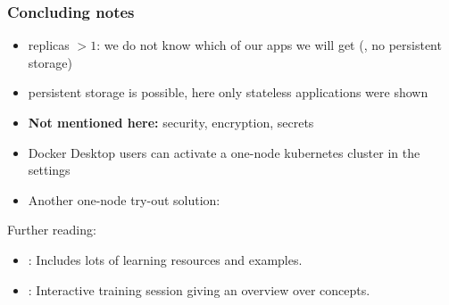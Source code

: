 \begin{frame}
	\frametitle{Concluding notes}
	
	\begin{itemize}
		\item replicas $>1$: we do not know which of our apps we will get (, no persistent storage)
		\item persistent storage is possible, here only stateless applications were shown
		\item \textbf{Not mentioned here:} security, encryption, secrets
		\item Docker Desktop users can activate a one-node kubernetes cluster in the settings
		\item Another one-node try-out solution: 
	\end{itemize}

	\begin{block}{Further reading:}
	\begin{itemize}
		\item {}: Includes lots of learning resources and examples.
		\item {}: Interactive training session giving an overview over concepts.
	\end{itemize}
	
	\end{block}
\end{frame}